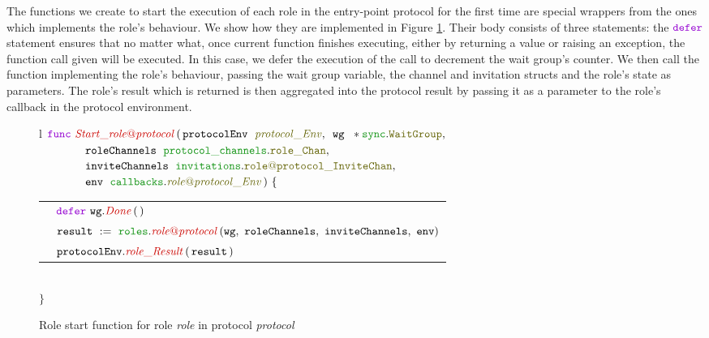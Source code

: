 \documentclass[12pt,twoside]{report}
\begin{document}
The functions we create to start the execution of each role in the entry-point protocol for the first time are special wrappers from the ones which implements the role's behaviour. We show how they are implemented in Figure \ref{role-start-function-gen}. Their body consists of three statements: the $\godefer$ statement ensures that no matter what, once current function finishes executing, either by returning a value or raising an exception, the function call given will be executed. In this case, we defer the execution of the call to decrement the wait group's counter. We then call the function implementing the role's behaviour, passing the wait group variable, the channel and invitation structs and the role's state as parameters. The role's result which is returned is then aggregated into the protocol result by passing it as a parameter to the role's callback in the protocol environment.\\

\begin{figure}[!h]
    \begin{center}
        \begin{tabular}{l}
            $\gofunc\ \functionname{Start\_\localprotocol{role}{protocol}} \, (\,\varname{protocolEnv}\ \;\interfacename{protocol\_Env},\ \,\varname{wg}\ \;*\pkgstructaccess{sync}{WaitGroup},$\\
            
            $\qquad \qquad \varname{roleChannels}\ \;\pkgstructaccess{protocol\_channels}{role\_Chan},$\\

            $\qquad \qquad \varname{inviteChannels}\ \;\pkgstructaccess{invitations}{\localprotocol{role}{protocol}\_InviteChan},$\\

            $\qquad \qquad \varname{env}\ \;\pkginterfaceaccess{callbacks}{\localprotocol{role}{protocol}\_Env}\,)\ \{$\\[3pt]

            \begin{tabular}{ll}
                \indent & $\godefer\ \methodcall{wg}{Done}\,(\,)$\\[3.5pt]
                \indent & $\assignment{result}{\pkgfuncaccess{roles}{role@protocol}\,(\roleimplparams)}$\\[3.5pt]
                \indent & $\methodcall{protocolEnv}{role\_Result}\,(\,\varname{result}\,)$
            \end{tabular}\\[3pt]
            $\}$
        \end{tabular}

    \end{center}
    \caption{Role start function for role \textit{role} in protocol \textit{protocol}}
    \label{role-start-function-gen}
\end{figure}
\end{document}
